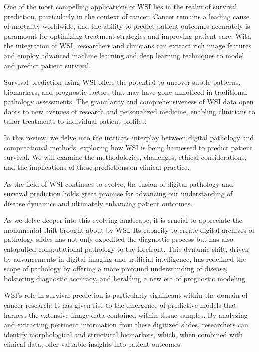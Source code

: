 \documentclass[journal,twoside,web]{ieeecolor}
\begin{document}
One of the most compelling applications of WSI lies in the realm of survival prediction, particularly in the context of cancer. Cancer remains a leading cause of mortality worldwide, and the ability to predict patient outcomes accurately is paramount for optimizing treatment strategies and improving patient care. With the integration of WSI, researchers and clinicians can extract rich image features and employ advanced machine learning and deep learning techniques to model and predict patient survival.

Survival prediction using WSI offers the potential to uncover subtle patterns, biomarkers, and prognostic factors that may have gone unnoticed in traditional pathology assessments. The granularity and comprehensiveness of WSI data open doors to new avenues of research and personalized medicine, enabling clinicians to tailor treatments to individual patient profiles.

In this review, we delve into the intricate interplay between digital pathology and computational methods, exploring how WSI is being harnessed to predict patient survival. We will examine the methodologies, challenges, ethical considerations, and the implications of these predictions on clinical practice.

As the field of WSI continues to evolve, the fusion of digital pathology and survival prediction holds great promise for advancing our understanding of disease dynamics and ultimately enhancing patient outcomes.

As we delve deeper into this evolving landscape, it is crucial to appreciate the monumental shift brought about by WSI. Its capacity to create digital archives of pathology slides has not only expedited the diagnostic process but has also catapulted computational pathology to the forefront. This dynamic shift, driven by advancements in digital imaging and artificial intelligence, has redefined the scope of pathology by offering a more profound understanding of disease, bolstering diagnostic accuracy, and heralding a new era of prognostic modeling.

WSI's role in survival prediction is particularly significant within the domain of cancer research. It has given rise to the emergence of predictive models that harness the extensive image data contained within tissue samples. By analyzing and extracting pertinent information from these digitized slides, researchers can identify morphological and structural biomarkers, which, when combined with clinical data, offer valuable insights into patient outcomes.
\end{document}
